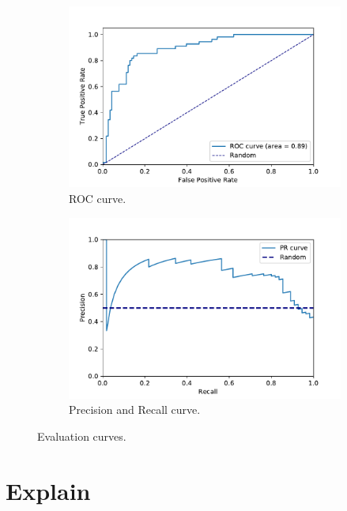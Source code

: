 \begin{figure}
\centering
\begin{subfigure}{.5\textwidth}
  \centering
  \includegraphics[width=1\linewidth]{figures/Experiements/Eval/ROC_curve.pdf}
  \caption{ROC curve.}
  \label{fig:roc_curve}
\end{subfigure}%
\begin{subfigure}{.5\textwidth}
  \centering
  \includegraphics[width=1\linewidth]{figures/Experiements/Eval/pr_curve_curve.pdf}
  \caption{Precision and Recall curve.}
  \label{fig:pr_curve}
\end{subfigure}
\caption[Curve]{Evaluation curves.}
\label{fig:roc_and_pr_curve}
\end{figure}

\newpage
\section{Explain}

